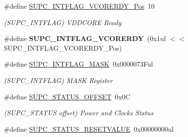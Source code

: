 \begin{DoxyCompactItemize}
\item 
\hypertarget{group___s_a_m_l21___s_u_p_c_gaaeba608dacc3c599875844b88ba14df5}{}\#define \hyperlink{group___s_a_m_l21___s_u_p_c_gaaeba608dacc3c599875844b88ba14df5}{S\+U\+P\+C\+\_\+\+I\+N\+T\+F\+L\+A\+G\+\_\+\+V\+C\+O\+R\+E\+R\+D\+Y\+\_\+\+Pos}~10\label{group___s_a_m_l21___s_u_p_c_gaaeba608dacc3c599875844b88ba14df5}

\begin{DoxyCompactList}\small\item\em (S\+U\+P\+C\+\_\+\+I\+N\+T\+F\+L\+A\+G) V\+D\+D\+C\+O\+R\+E Ready \end{DoxyCompactList}\item 
\hypertarget{group___s_a_m_l21___s_u_p_c_gaea99bb490d53060e92d7e2d3301a03ff}{}\#define {\bfseries S\+U\+P\+C\+\_\+\+I\+N\+T\+F\+L\+A\+G\+\_\+\+V\+C\+O\+R\+E\+R\+D\+Y}~(0x1ul $<$$<$ S\+U\+P\+C\+\_\+\+I\+N\+T\+F\+L\+A\+G\+\_\+\+V\+C\+O\+R\+E\+R\+D\+Y\+\_\+\+Pos)\label{group___s_a_m_l21___s_u_p_c_gaea99bb490d53060e92d7e2d3301a03ff}

\item 
\hypertarget{group___s_a_m_l21___s_u_p_c_ga051957abcc7254347a25132c1e090521}{}\#define \hyperlink{group___s_a_m_l21___s_u_p_c_ga051957abcc7254347a25132c1e090521}{S\+U\+P\+C\+\_\+\+I\+N\+T\+F\+L\+A\+G\+\_\+\+M\+A\+S\+K}~0x0000073\+Ful\label{group___s_a_m_l21___s_u_p_c_ga051957abcc7254347a25132c1e090521}

\begin{DoxyCompactList}\small\item\em (S\+U\+P\+C\+\_\+\+I\+N\+T\+F\+L\+A\+G) M\+A\+S\+K Register \end{DoxyCompactList}\item 
\hypertarget{group___s_a_m_l21___s_u_p_c_ga4617aca8bde40b6eb9b020c5e70e6d60}{}\#define \hyperlink{group___s_a_m_l21___s_u_p_c_ga4617aca8bde40b6eb9b020c5e70e6d60}{S\+U\+P\+C\+\_\+\+S\+T\+A\+T\+U\+S\+\_\+\+O\+F\+F\+S\+E\+T}~0x0\+C\label{group___s_a_m_l21___s_u_p_c_ga4617aca8bde40b6eb9b020c5e70e6d60}

\begin{DoxyCompactList}\small\item\em (S\+U\+P\+C\+\_\+\+S\+T\+A\+T\+U\+S offset) Power and Clocks Status \end{DoxyCompactList}\item 
\hypertarget{group___s_a_m_l21___s_u_p_c_ga765bc7bc8c1ca7e33adb522877a83b47}{}\#define \hyperlink{group___s_a_m_l21___s_u_p_c_ga765bc7bc8c1ca7e33adb522877a83b47}{S\+U\+P\+C\+\_\+\+S\+T\+A\+T\+U\+S\+\_\+\+R\+E\+S\+E\+T\+V\+A\+L\+U\+E}~0x00000000ul\label{group___s_a_m_l21___s_u_p_c_ga765bc7bc8c1ca7e33adb522877a83b47}


\end{DoxyCompactItemize}
